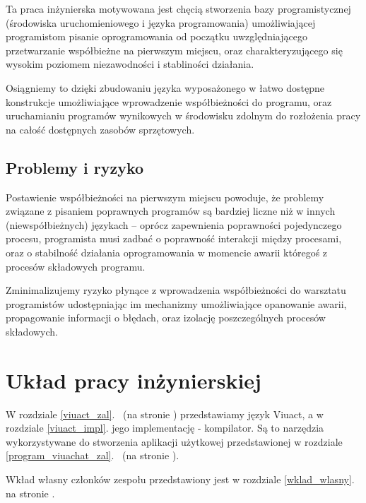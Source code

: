 Ta praca inżynierska motywowana jest chęcią stworzenia bazy programistycznej (środowiska uruchomieniowego i
języka programowania) umożliwiającej programistom pisanie oprogramowania od początku uwzględniającego
przetwarzanie współbieżne na pierwszym miejscu, oraz charakteryzującego się wysokim poziomem niezawodności i
stabliności działania.

Osiągniemy to dzięki zbudowaniu języka wyposażonego w łatwo dostępne konstrukcje umożliwiające wprowadzenie
współbieżności do programu, oraz uruchamianiu programów wynikowych w środowisku zdolnym do rozłożenia pracy na
całość dostępnych zasobów sprzętowych.

\subsection{Problemy i ryzyko}

Postawienie współbieżności na pierwszym miejscu powoduje, że problemy związane z pisaniem poprawnych programów
są bardziej liczne niż w innych (niewspółbieżnych) językach -- oprócz zapewnienia poprawności pojedynczego
procesu, programista musi zadbać o poprawność interakcji między procesami, oraz o stabilność działania
oprogramowania w momencie awarii któregoś z procesów składowych programu.

Zminimalizujemy ryzyko płynące z wprowadzenia współbieżności do warsztatu programistów udostępniając im
mechanizmy umożliwiające opanowanie awarii, propagowanie informacji o błędach, oraz izolację poszczególnych
procesów składowych.

\section{Układ pracy inżynierskiej}

W rozdziale \ref{viuact_zal}.~ (na stronie \pageref{viuact_zal}) przedstawiamy język
Viuact, a w rozdziale \ref{viuact_impl}. jego implementację - kompilator. Są to narzędzia wykorzystywane do
stworzenia aplikacji użytkowej przedstawionej w rozdziale
\ref{program_viuachat_zal}.~ (na stronie \pageref{program_viuachat_zal}).

Wkład własny członków zespołu przedstawiony jest w rozdziale \ref{wklad_wlasny}. na stronie
\pageref{wklad_wlasny}.


